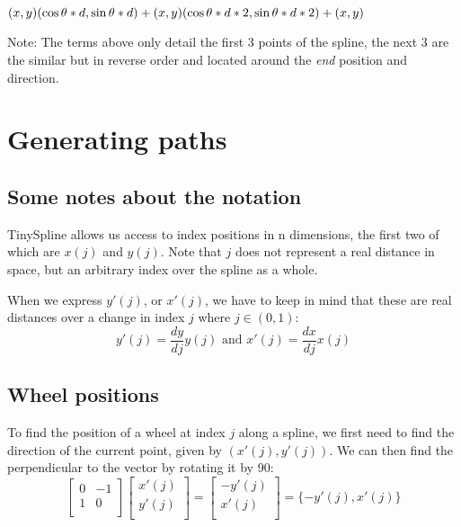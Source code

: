 \documentclass[12pt, english]{article}
\begin{document}
\noindent
\begin{math}
(x, y) \\
(\cos{\theta} * d, \sin{\theta} * d) + (x, y) \\
(\cos{\theta} * d * 2, \sin{\theta} * d * 2) + (x, y) \\
\end{math}

Note: The terms above only detail the first 3 points of the spline, the next 3 are the similar but in reverse order and located around the \textit{end} position and direction.

\section{Generating paths}
\subsection{Some notes about the notation}
TinySpline allows us access to index positions in n dimensions, the first two of which are $x(j)$ and $y(j)$. Note that $j$ does not represent a real distance in space, but an arbitrary index over the spline as a whole. 

When we express $y'(j)$, or $x'(j)$, we have to keep in mind that these are real distances over a change in index $j$ where $j \in (0,1)$:
\begin{equation}
	y'(j) = \frac{dy}{dj} y(j) \text{  and  } x'(j) = \frac{dx}{dj} x(j) 
\end{equation}

\subsection{Wheel positions}
To find the position of a wheel at index $j$ along a spline, we first need to find the direction of the current point, given by $(x'(j), y'(j))$. We can then find the perpendicular to the vector by rotating it by 90\degree: \\

\begin{equation}
	\begin{bmatrix}
		0 & -1 \\
		1 & 0 \\
	\end{bmatrix}
	\begin{bmatrix}
		x'(j)\\
		y'(j)\\
	\end{bmatrix}
	=
	\begin{bmatrix}
		-y'(j)\\
		x'(j)\\
	\end{bmatrix}
	= \{-y'(j), x'(j)\}
\end{equation}
\end{document}
